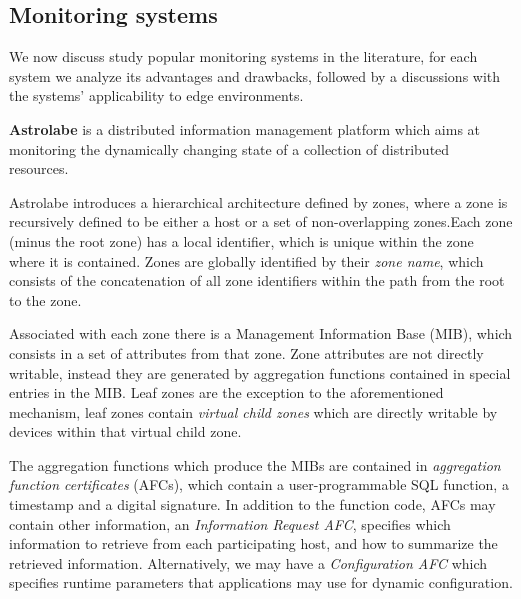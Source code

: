 




\subsection{Monitoring systems}

We now discuss study popular monitoring systems in the literature, for each system we analyze its advantages and drawbacks, followed by a discussions with the systems' applicability to edge environments.

\textbf{Astrolabe} \cite{Renesse2003} is a distributed information management platform which aims at monitoring the dynamically changing state of a collection of distributed resources. 

Astrolabe introduces a hierarchical architecture defined by zones, where a zone is recursively defined to be either a host or a set of non-overlapping zones.Each zone (minus the root zone) has a local identifier, which is unique within the zone where it is contained. Zones are globally identified by their \textit{zone name}, which consists of the concatenation of all zone identifiers within the path from the root to the zone.

Associated with each zone there is a Management Information Base (MIB), which consists in a set of attributes from that zone. Zone attributes are not directly writable, instead they are generated by aggregation functions contained in special entries in the MIB. Leaf zones are the exception to the aforementioned mechanism, leaf zones contain \textit{virtual child zones} which are directly writable by devices within that virtual child zone.

The aggregation functions which produce the MIBs are contained in \textit{aggregation function certificates} (AFCs), which contain a user-programmable SQL function, a timestamp and a digital signature. In addition to the function code, AFCs may contain other information, an \textit{Information Request AFC},  specifies which information to retrieve from each participating host, and how to summarize the retrieved information. Alternatively, we may have a \textit{Configuration AFC} which specifies runtime parameters that applications may use for dynamic configuration.

